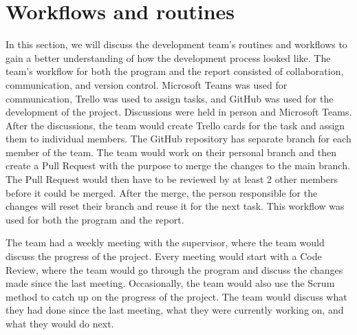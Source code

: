 \section{Workflows and routines}\label{sec:workflows-and-routines}

In this section, we will discuss the development team's routines and workflows to gain a better understanding of how
the development process looked like.
The team's workflow for both the program and the report consisted of collaboration, communication, and version control.
Microsoft Teams was used for communication, Trello was used to assign tasks, and GitHub was used for the development of
the project.
Discussions were held in person and Microsoft Teams.
After the discussions, the team would create Trello cards for the task and assign them to individual members.
The GitHub repository has separate branch for each member of the team.
The team would work on their personal branch and then create a Pull Request with the purpose to merge the changes to the
main branch.
The Pull Request would then have to be reviewed by at least 2 other members before it could be merged.
After the merge, the person responsible for the changes will reset their branch and reuse it for the next task.
This workflow was used for both the program and the report.

The team had a weekly meeting with the supervisor, where the team would discuss the progress of the project.
Every meeting would start with a Code Review, where the team would go through the program and discuss the changes made
since the last meeting.
Occasionally, the team would also use the Scrum method to catch up on the progress of the project.
The team would discuss what they had done since the last meeting, what they were currently working on, and what they
would do next.

